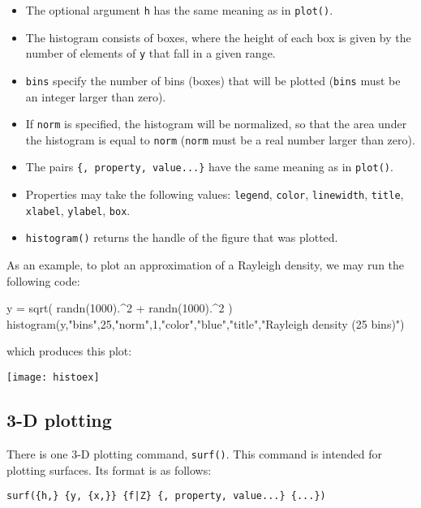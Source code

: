 \documentclass[11pt]{article}
\newcommand{\cmd}[1]{\texttt{#1}}
\begin{document}
\begin{itemize}
	\item The optional argument \cmd{h} has the same meaning as in
		\cmd{plot()}.
	\item The histogram consists of boxes, where the height of each box is
		given by the number of elements of \cmd{y} that fall in a given range.
	\item \cmd{bins} specify the number of bins (boxes) that will be plotted
		(\cmd{bins} must be an integer larger than zero).
	\item If \cmd{norm} is specified, the histogram will be normalized, so that
		the area under the histogram is equal to \cmd{norm} (\cmd{norm} must be
		a real number larger than zero).
	\item The pairs \cmd{\{, property, value...\}} have the same meaning as in
		\cmd{plot()}.
	\item Properties may take the following values: \cmd{legend}, \cmd{color},
		\cmd{linewidth}, \cmd{title}, \cmd{xlabel}, \cmd{ylabel}, \cmd{box}.
	\item \cmd{histogram()} returns the handle of the figure that was plotted.
\end{itemize}

As an example, to plot an approximation of a Rayleigh density, we may run the
following code:

\begin{juliacode}
y = sqrt( randn(1000).^2 + randn(1000).^2 )
histogram(y,"bins",25,"norm",1,"color","blue","title","Rayleigh density (25 bins)")
\end{juliacode}

which produces this plot:

\begin{center}
	\texttt{[image: histoex]}
\end{center}

\subsection{3-D plotting}

There is one 3-D plotting command, \cmd{surf()}. This command is intended for
plotting surfaces. Its format is as follows:

\cmd{surf(\{h,\} \{y, \{x,\}\} \{f|Z\} \{, property, value...\} \{...\})}
\end{document}
